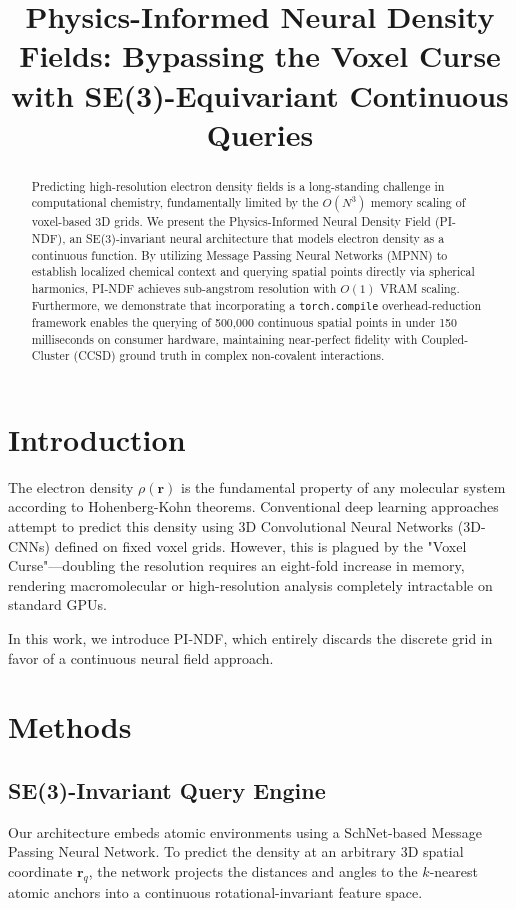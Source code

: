 \documentclass[a4paper,12pt]{article}
\begin{document}
\title{Physics-Informed Neural Density Fields: Bypassing the Voxel Curse with SE(3)-Equivariant Continuous Queries}

\author{}
\date{}

\maketitle

\begin{abstract}
Predicting high-resolution electron density fields is a long-standing challenge in computational chemistry, fundamentally limited by the $O(N^3)$ memory scaling of voxel-based 3D grids. We present the Physics-Informed Neural Density Field (PI-NDF), an SE(3)-invariant neural architecture that models electron density as a continuous function. By utilizing Message Passing Neural Networks (MPNN) to establish localized chemical context and querying spatial points directly via spherical harmonics, PI-NDF achieves sub-angstrom resolution with $O(1)$ VRAM scaling. Furthermore, we demonstrate that incorporating a \texttt{torch.compile} overhead-reduction framework enables the querying of 500,000 continuous spatial points in under 150 milliseconds on consumer hardware, maintaining near-perfect fidelity with Coupled-Cluster (CCSD) ground truth in complex non-covalent interactions.
\end{abstract}


\section{\label{sec:intro}Introduction}
The electron density $\rho(\mathbf{r})$ is the fundamental property of any molecular system according to Hohenberg-Kohn theorems. Conventional deep learning approaches attempt to predict this density using 3D Convolutional Neural Networks (3D-CNNs) defined on fixed voxel grids. However, this is plagued by the "Voxel Curse"---doubling the resolution requires an eight-fold increase in memory, rendering macromolecular or high-resolution analysis completely intractable on standard GPUs.

In this work, we introduce PI-NDF, which entirely discards the discrete grid in favor of a continuous neural field approach.

\section{\label{sec:methods}Methods}

\subsection{SE(3)-Invariant Query Engine}
Our architecture embeds atomic environments using a SchNet-based Message Passing Neural Network. To predict the density at an arbitrary 3D spatial coordinate $\mathbf{r}_q$, the network projects the distances and angles to the $k$-nearest atomic anchors into a continuous rotational-invariant feature space. 
\end{document}
